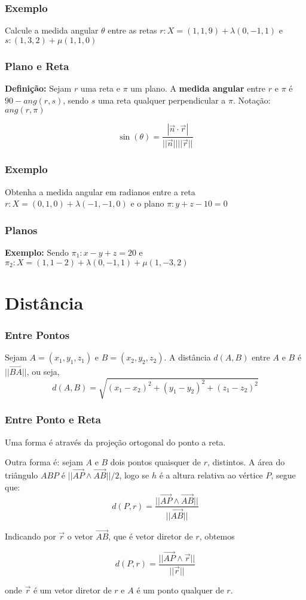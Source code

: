 \documentclass[hyperref={pdfpagelabels=false}]{beamer}
\begin{document}
\begin{frame}
\frametitle{Exemplo}

Calcule a medida angular $\theta$ entre as retas $r:X = (1,1,9) + \lambda(0,-1,1)$ e $s:(1,3,2) + \mu(1,1,0)$
\end{frame}

\begin{frame}
\frametitle{Plano e Reta}
{\bf Definição: } Sejam $r$ uma reta e $\pi$ um plano. A {\bf medida angular} entre $r$ e $\pi$ é $90 - ang(r,s)$, sendo $s$ uma reta qualquer perpendicular a $\pi$. Notação: $ang(r,\pi)$

\pause

$$\sin(\theta) = \frac{|\overrightarrow{n} \cdot \overrightarrow{r}|}{||\overrightarrow{n}||||\overrightarrow{r}||}$$

\end{frame}

\begin{frame}
\frametitle{Exemplo}
Obtenha a medida angular em radianos entre a reta $r: X = (0,1,0) + \lambda(-1,-1,0)$ e o plano $\pi:y+z-10=0$


\end{frame}


\begin{frame}
\frametitle{Planos}

{\bf Exemplo: } Sendo $\pi_1: x -y + z = 20$ e $\pi_2: X= (1,1-2) + \lambda(0,-1,1) + \mu(1,-3,2)$


\end{frame}

\section{Distância}

\begin{frame}
\frametitle{Entre Pontos}

Sejam $A = (x_1, y_1, z_1)$ e $B = (x_2, y_2, z_2)$. A distância $d(A,B)$ entre $A$ e $B$ é $||\overrightarrow{BA}||$, ou seja, 
$$d(A,B) = \sqrt{(x_1 - x_2)^2 + (y_1 - y_2)^2 + (z_1 - z_2)^2}$$

\end{frame}

\begin{frame}
\frametitle{Entre Ponto e Reta}

Uma forma é através da projeção ortogonal do ponto a reta.

\pause

Outra forma é: sejam $A$ e $B$ dois pontos quaisquer de $r$, distintos. A área do triângulo $ABP$ é $||\overrightarrow{AP} \land \overrightarrow{AB}||/2$, logo se $h$ é a altura relativa ao vértice $P$, segue que:
$$d(P,r) = \frac{||\overrightarrow{AP} \land \overrightarrow{AB}||}{||\overrightarrow{AB}||}$$

\pause
Indicando por $\overrightarrow{r}$ o vetor $\overrightarrow{AB}$, que é vetor diretor de $r$, obtemos

$$d(P,r) = \frac{||\overrightarrow{AP} \land \overrightarrow{r}||}{||\overrightarrow{r}||}$$

onde $\overrightarrow{r}$ é um vetor diretor de $r$ e $A$ é um ponto qualquer de $r$.

\end{frame}
\end{document}
